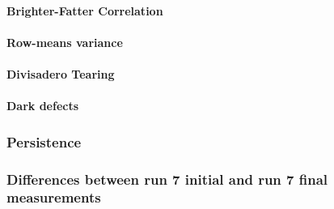 \paragraph{Brighter-Fatter Correlation}\label{final-brighter-fatter-correlation}



\paragraph{Row-means variance}\label{final-row-means-var}



\paragraph{Divisadero Tearing}\label{final-divisadero-tearing}



\paragraph{Dark defects}\label{final-dark-defects}



\subsubsection{Persistence}\label{final-persistence}



\subsubsection{Differences between run 7 initial and run 7 final measurements}\label{final-differences-from-previous-runs}


